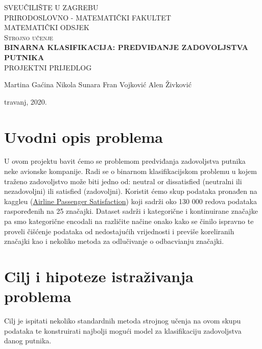 \documentclass[a4paper,12pt]{article}
\begin{document}
\begin{titlepage}
\begin{center}

\textsc{\large {SVEU\v{C}ILI\v{S}TE U ZAGREBU\\ PRIRODOSLOVNO - MATEMATIČKI FAKULTET\\  MATEMATIČKI ODSJEK}}\\[6.0cm]


\textsc{\Large {Strojno učenje}}\\[0.5cm]
\textsc{\huge\bfseries \Large BINARNA KLASIFIKACIJA: PREDVIĐANJE ZADOVOLJSTVA PUTNIKA} \\[1.0cm]
\textsc{\Large {PROJEKTNI PRIJEDLOG}}\\[0.5cm]

\vfill


\noindent
\begin{minipage}[t]{25cm}
\large{Martina Gaćina}\newline
\large{Nikola Sunara}\newline
\large{Fran Vojković}\newline
\large{Alen Živković}\newline
\end{minipage}

\large{travanj, 2020.}
\end{center}
\end{titlepage}

\section{Uvodni opis problema}
U ovom projektu bavit ćemo se problemom predviđanja zadovoljstva putnika neke avionske kompanije. Radi se o binarnom klasifikacijskom problemu u kojem traženo zadovoljstvo može biti jedno od: neutral or dissatisfied (neutralni ili nezadovoljni) ili satisfied (zadovoljni). Koristit ćemo skup podataka pronađen na kaggleu (\href{https://www.kaggle.com/teejmahal20/airline-passenger-satisfaction}{Airline Passenger Satisfaction}) koji sadrži oko 130 000 redova podataka raspoređenih na 25 značajki. Dataset sadrži i kategorične i kontinuirane značajke pa smo kategorične encodali na različite načine onako kako se činilo ispravno te proveli čišćenje podataka od nedostajućih vrijednosti i previše koreliranih značajki kao i nekoliko metoda za odlučivanje o odbacvianju značajki.

\section{Cilj i hipoteze istraživanja problema}
Cilj je ispitati nekoliko standardnih metoda strojnog učenja na ovom skupu podataka te konstruirati najbolji mogući model za klasifikaciju zadovoljstva danog putnika.
\end{document}
